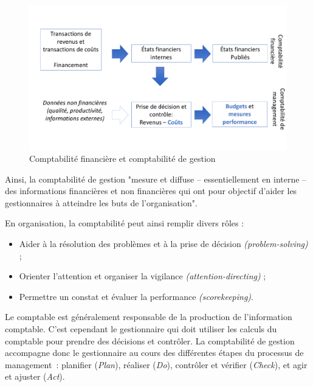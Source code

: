 \documentclass[oneside]{kaobook}
\begin{document}
\begin{figure}[H]

\includegraphics{./img/comptafi.pdf}
\caption{\label{fig:org306e482}Comptabilité financière et comptabilité de gestion}
\end{figure}

Ainsi, la comptabilité de gestion "mesure et diffuse – essentiellement en interne – des informations financières et non financières qui ont pour objectif d'aider les gestionnaires à atteindre les buts de l’organisation".

En organisation, la comptabilité peut ainsi remplir divers rôles :
\begin{itemize}
\item Aider à la résolution des problèmes et à la prise de décision \emph{(problem-solving)} ;
\item Orienter l’attention et organiser la vigilance \emph{(attention-directing)} ;
\item Permettre un constat et évaluer la performance \emph{(scorekeeping)}.
\end{itemize}

Le comptable est généralement responsable de la production de l'information comptable. C'est cependant le gestionnaire qui doit utiliser les calculs du comptable pour prendre des décisions et contrôler. La comptabilité de gestion accompagne donc le gestionnaire au cours des différentes étapes du processus de management : planifier (\emph{Plan}), réaliser (\emph{Do}), contrôler et vérifier (\emph{Check}), et agir et ajuster (\emph{Act}).
\end{document}

